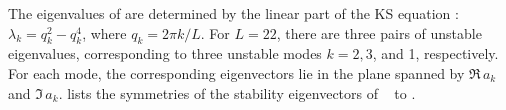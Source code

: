 
The eigenvalues of  are determined by the linear part of the KS
equation : $\lambda_k=q_k^2-q_k^4$, where $q_k = 2\pi k/L$.  For
$L=22$, there are three pairs of unstable eigenvalues, corresponding
to three unstable modes $k=2,3$, and 1, respectively.  For each
mode, the corresponding eigenvectors lie in the plane spanned by
$\Re \, a_k$ and $\Im \, a_k$. 
lists the symmetries of the stability eigenvectors of
\eqva\  to .


